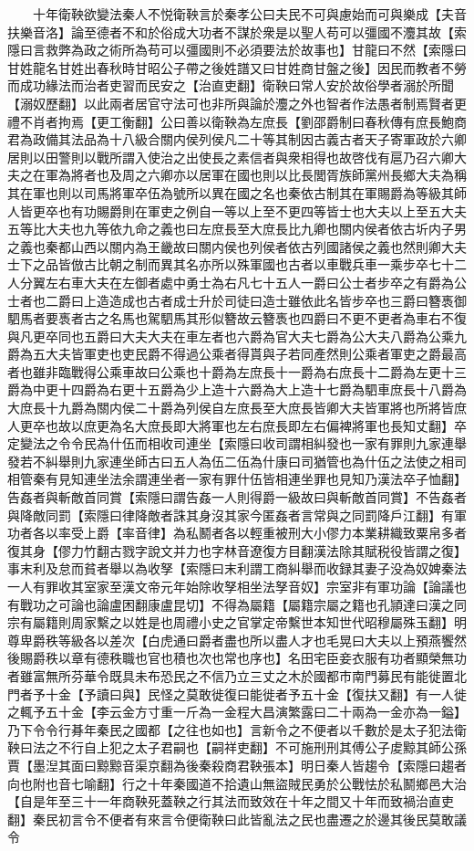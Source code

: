 　　十年衛鞅欲變法秦人不悦衛鞅言於秦孝公曰夫民不可與慮始而可與樂成【夫音扶樂音洛】論至德者不和於俗成大功者不謀於衆是以聖人苟可以彊國不灋其故【索隱曰言救弊為政之術所為苟可以彊國則不必須要法於故事也】甘龍曰不然【索隱曰甘姓龍名甘姓出春秋時甘昭公子帶之後姓譜又曰甘姓商甘盤之後】因民而教者不勞而成功緣法而治者吏習而民安之【治直吏翻】衛鞅曰常人安於故俗學者溺於所聞【溺奴歷翻】以此兩者居官守法可也非所與論於灋之外也智者作法愚者制焉賢者更禮不肖者拘焉【更工衡翻】公曰善以衛鞅為左庶長【劉邵爵制曰春秋傳有庶長鮑商君為政備其法品為十八級合關内侯列侯凡二十等其制因古義古者天子寄軍政於六卿居則以田警則以戰所謂入使治之出使長之素信者與衆相得也故啓伐有扈乃召六卿大夫之在軍為將者也及周之六卿亦以居軍在國也則以比長閭胥族師黨州長鄉大夫為稱其在軍也則以司馬將軍卒伍為號所以異在國之名也秦依古制其在軍賜爵為等級其師人皆更卒也有功賜爵則在軍吏之例自一等以上至不更四等皆士也大夫以上至五大夫五等比大夫也九等依九命之義也曰左庶長至大庶長比九卿也關内侯者依古圻内子男之義也秦都山西以關内為王畿故曰關内侯也列侯者依古列國諸侯之義也然則卿大夫士下之品皆倣古比朝之制而異其名亦所以殊軍國也古者以車戰兵車一乘步卒七十二人分翼左右車大夫在左御者處中勇士為右凡七十五人一爵曰公士者步卒之有爵為公士者也二爵曰上造造成也古者成士升於司徒曰造士雖依此名皆步卒也三爵曰簪褭御駟馬者要褭者古之名馬也駕駟馬其形似簪故云簪褭也四爵曰不更不更者為車右不復與凡更卒同也五爵曰大夫大夫在車左者也六爵為官大夫七爵為公大夫八爵為公乘九爵為五大夫皆軍吏也吏民爵不得過公乘者得貰與子若同產然則公乘者軍吏之爵最高者也雖非臨戰得公乘車故曰公乘也十爵為左庶長十一爵為右庶長十二爵為左更十三爵為中更十四爵為右更十五爵為少上造十六爵為大上造十七爵為駟車庶長十八爵為大庶長十九爵為關内侯二十爵為列侯自左庶長至大庶長皆卿大夫皆軍將也所將皆庶人更卒也故以庶更為名大庶長即大將軍也左右庶長即左右偏裨將軍也長知丈翻】卒定變法之令令民為什伍而相收司連坐【索隱曰收司謂相糾發也一家有罪則九家連舉發若不糾舉則九家連坐師古曰五人為伍二伍為什康曰司猶管也為什伍之法使之相司相管秦有見知連坐法余謂連坐者一家有罪什伍皆相連坐罪也見知乃漢法卒子恤翻】告姦者與斬敵首同賞【索隱曰謂告姦一人則得爵一級故曰與斬敵首同賞】不告姦者與降敵同罰【索隱曰律降敵者誅其身沒其家今匿姦者言常與之同罰降戶江翻】有軍功者各以率受上爵【率音律】為私鬭者各以輕重被刑大小僇力本業耕織致粟帛多者復其身【僇力竹翻古戮字說文并力也字林音遼復方目翻漢法除其賦税役皆謂之復】事末利及怠而貧者舉以為收孥【索隱曰末利謂工商糾舉而收録其妻子没為奴婢秦法一人有罪收其室家至漢文帝元年始除收孥相坐法孥音奴】宗室非有軍功論【論議也有戰功之可論也論盧困翻康盧昆切】不得為屬籍【屬籍宗屬之籍也孔頴達曰漢之同宗有屬籍則周家繫之以姓是也周禮小史之官掌定帝繫世本知世代昭穆屬殊玉翻】明尊卑爵秩等級各以差次【白虎通曰爵者盡也所以盡人才也毛晃曰大夫以上預燕饗然後賜爵秩以章有德秩職也官也積也次也常也序也】名田宅臣妾衣服有功者顯榮無功者雖富無所芬華令既具未布恐民之不信乃立三丈之木於國都市南門募民有能徙置北門者予十金【予讀曰與】民怪之莫敢徙復曰能徙者予五十金【復扶又翻】有一人徙之輒予五十金【李云金方寸重一斤為一金程大昌演繁露曰二十兩為一金亦為一鎰】乃下令令行朞年秦民之國都【之往也如也】言新令之不便者以千數於是太子犯法衛鞅曰法之不行自上犯之太子君嗣也【嗣祥吏翻】不可施刑刑其傅公子䖍黥其師公孫賈【墨湼其面曰黥黥音渠京翻為後秦殺商君鞅張本】明日秦人皆趨令【索隱曰趨者向也附也音七喻翻】行之十年秦國道不拾遺山無盜賊民勇於公戰怯於私鬭鄉邑大治【自是年至三十一年商鞅死蓋鞅之行其法而致效在十年之間又十年而致禍治直吏翻】秦民初言令不便者有來言令便衛鞅曰此皆亂法之民也盡遷之於邊其後民莫敢議令

